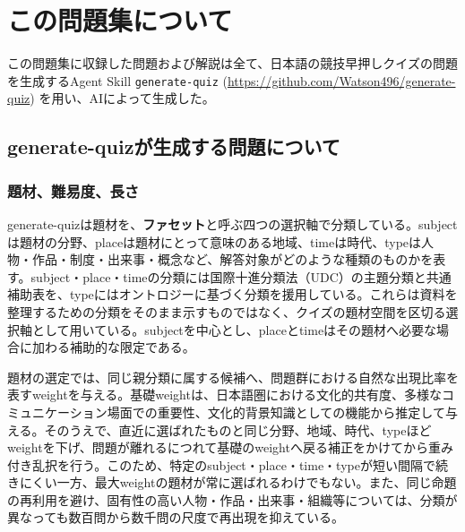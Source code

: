 \chapter*{この問題集について}

この問題集に収録した問題および解説は全て、日本語の競技早押しクイズの問題を生成するAgent Skill \texttt{generate-quiz} (\url{https://github.com/Watson496/generate-quiz}) を用い、AIによって生成した。

\begin{description}[style=multiline,leftmargin=7\zw,labelwidth=6\zw]
  \item[作成日] \QuizCreationDate
  \item[使用ツール] \QuizGenerationTool
  \item[使用モデル] \QuizGenerationModel
\end{description}

\section*{generate-quizが生成する問題について}

\subsection*{題材、難易度、長さ}

generate-quizは題材を、\textbf{ファセット}と呼ぶ四つの選択軸で分類している。subjectは題材の分野、placeは題材にとって意味のある地域、timeは時代、typeは人物・作品・制度・出来事・概念など、解答対象がどのような種類のものかを表す。subject・place・timeの分類には国際十進分類法（UDC）の主題分類と共通補助表を、typeにはオントロジーに基づく分類を援用している。これらは資料を整理するための分類をそのまま示すものではなく、クイズの題材空間を区切る選択軸として用いている。subjectを中心とし、placeとtimeはその題材へ必要な場合に加わる補助的な限定である。

題材の選定では、同じ親分類に属する候補へ、問題群における自然な出現比率を表すweightを与える。基礎weightは、日本語圏における文化的共有度、多様なコミュニケーション場面での重要性、文化的背景知識としての機能から推定して与える。そのうえで、直近に選ばれたものと同じ分野、地域、時代、typeほどweightを下げ、問題が離れるにつれて基礎のweightへ戻る補正をかけてから重み付き乱択を行う。このため、特定のsubject・place・time・typeが短い間隔で続きにくい一方、最大weightの題材が常に選ばれるわけでもない。また、同じ命題の再利用を避け、固有性の高い人物・作品・出来事・組織等については、分類が異なっても数百問から数千問の尺度で再出現を抑えている。

